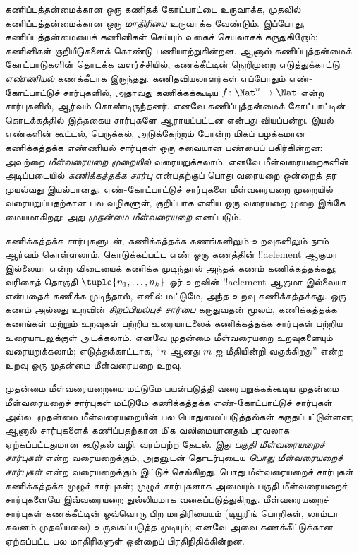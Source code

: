 \documentclass[../../../include/open-logic-section]{subfiles}
\begin{document}


கணிப்புத்தன்மைக்கான ஒரு கணிதக் கோட்பாட்டை உருவாக்க, முதலில்
கணிப்புத்தன்மைக்கான ஒரு \emph{மாதிரியை} உருவாக்க வேண்டும். இப்போது,
கணிப்புத்தன்மையைக் கணினிகள் செய்யும் வகைச் செயலாகக் கருதுகிறோம்;
கணினிகள் குறியீடுகளைக் கொண்டு பணியாற்றுகின்றன. ஆனால் கணிப்புத்தன்மைக்
கோட்பாடுகளின் தொடக்க வளர்ச்சியில், கணக்கீட்டின் நெறிமுறை
எடுத்துக்காட்டு \emph{எண்ணியல்} கணக்கீடாக இருந்தது. கணிதவியலாளர்கள்
எப்போதும் எண்-கோட்பாட்டுச் சார்புகளில், அதாவது கணிக்கக்கூடிய
$f\colon \Nat^n \to \Nat$ என்ற சார்புகளில், ஆர்வம் கொண்டிருந்தனர்.
எனவே கணிப்புத்தன்மைக் கோட்பாட்டின் தொடக்கத்தில் இத்தகைய சார்புகளே
ஆராயப்பட்டன என்பது வியப்பன்று. இயல் எண்களின் கூட்டல், பெருக்கல்,
அடுக்கேற்றம் போன்ற மிகப் பழக்கமான கணிக்கத்தக்க எண்ணியல் சார்புகள்
ஒரு சுவையான பண்பைப் பகிர்கின்றன: அவற்றை
\emph{மீள்வரையறை முறையில்} வரையறுக்கலாம். எனவே மீள்வரையறைகளின்
அடிப்படையில் \emph{கணிக்கத்தக்க சார்பு} என்பதற்குப் பொது வரையறை
ஒன்றைத் தர முயல்வது இயல்பானது. எண்-கோட்பாட்டுச் சார்புகளை
மீள்வரையறை முறையில் வரையறுப்பதற்கான பல வழிகளுள், குறிப்பாக எளிய
ஒரு வரையறை முறை இங்கே மையமாகிறது: அது
\emph{முதன்மை மீள்வரையறை} எனப்படும்.

கணிக்கத்தக்க சார்புகளுடன், கணிக்கத்தக்க கணங்களிலும் உறவுகளிலும் நாம்
ஆர்வம் கொள்ளலாம். கொடுக்கப்பட்ட எண் ஒரு கணத்தின் !!a{element} ஆகுமா
இல்லையா என்ற விடையைக் கணிக்க முடிந்தால் அந்தக் கணம் கணிக்கத்தக்கது;
வரிசைத் தொகுதி $\tuple{n_1, \dots, n_k}$ ஓர் உறவின்
!!a{element} ஆகுமா இல்லையா என்பதைக் கணிக்க முடிந்தால், எனில் மட்டுமே,
அந்த உறவு கணிக்கத்தக்கது. ஒரு கணம் அல்லது உறவின்
\emph{சிறப்பியல்புச் சார்பை} கருதுவதன் மூலம், கணிக்கத்தக்க கணங்கள்
மற்றும் உறவுகள் பற்றிய உரையாடலைக் கணிக்கத்தக்க சார்புகள் பற்றிய
உரையாடலுக்குள் அடக்கலாம். எனவே முதன்மை மீள்வரையறை உறவுகளையும்
வரையறுக்கலாம்; எடுத்துக்காட்டாக, ``$n$ ஆனது $m$ ஐ மீதியின்றி
வகுக்கிறது'' என்ற உறவு ஒரு முதன்மை மீள்வரையறை உறவு.

முதன்மை மீள்வரையறையை மட்டுமே பயன்படுத்தி வரையறுக்கக்கூடிய முதன்மை
மீள்வரையறைச் சார்புகள் மட்டுமே கணிக்கத்தக்க எண்-கோட்பாட்டுச்
சார்புகள் அல்ல. முதன்மை மீள்வரையறையின் பல பொதுமைப்படுத்தல்கள்
கருதப்பட்டுள்ளன; ஆனால் சார்புகளைக் கணிப்பதற்கான மிக வலிமையானதும்
பரவலாக ஏற்கப்பட்டதுமான கூடுதல் வழி, வரம்பற்ற தேடல். இது
\emph{பகுதி மீள்வரையறைச் சார்புகள்} என்ற வரையறைக்கும், அதனுடன்
தொடர்புடைய \emph{பொது மீள்வரையறைச் சார்புகள்} என்ற வரையறைக்கும்
இட்டுச் செல்கிறது. பொது மீள்வரையறைச் சார்புகள் கணிக்கத்தக்க
முழுச் சார்புகள்; முழுச் சார்புகளாக அமையும் பகுதி மீள்வரையறைச்
சார்புகளையே இவ்வரையறை துல்லியமாக வகைப்படுத்துகிறது. மீள்வரையறைச்
சார்புகள் கணக்கீட்டின் ஒவ்வொரு பிற மாதிரியையும் (டியூரிங் பொறிகள்,
லாம்டா கலனம் முதலியவை) உருவகப்படுத்த முடியும்; எனவே அவை
கணக்கீட்டுக்கான ஏற்கப்பட்ட பல மாதிரிகளுள் ஒன்றைப் பிரதிநிதிக்கின்றன.
\end{document}
